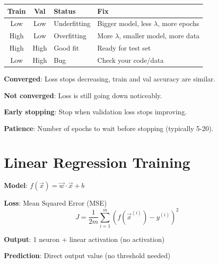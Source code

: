 \documentclass[11pt,a4paper]{article}
\begin{document}
\begin{definitionbox}

\begin{tabular}{@{}cc|l|l@{}}
\textbf{Train} & \textbf{Val} & \textbf{Status} & \textbf{Fix} \\
\hline
Low & Low & Underfitting & Bigger model, less $\lambda$, more epochs \\
High & Low & Overfitting & More $\lambda$, smaller model, more data \\
High & High & Good fit & Ready for test set \\
Low & High & Bug & Check your code/data \\
\end{tabular}
\end{definitionbox}

\begin{notebox}

\textbf{Converged}: Loss stops decreasing, train and val accuracy are similar.

\textbf{Not converged}: Loss is still going down noticeably.

\textbf{Early stopping}: Stop when validation loss stops improving.

\textbf{Patience}: Number of epochs to wait before stopping (typically 5-20).
\end{notebox}

\section{Linear Regression Training}

\begin{definitionbox}

\textbf{Model}: $f(\vec{x}) = \vec{w} \cdot \vec{x} + b$

\textbf{Loss}: Mean Squared Error (MSE)
\[J = \frac{1}{2m}\sum_{i=1}^{m}(f(\vec{x}^{(i)}) - y^{(i)})^2\]

\textbf{Output}: 1 neuron + linear activation (no activation)

\textbf{Prediction}: Direct output value (no threshold needed)
\end{definitionbox}
\end{document}
